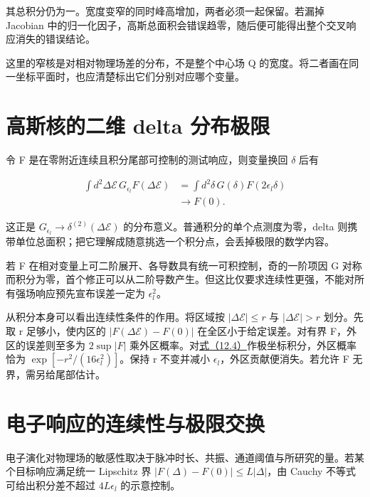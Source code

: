 \documentclass[UTF8,a4paper,zihao=-4,openany,fontset=fandol]{ctexbook}
\begin{document}
其总积分仍为一。宽度变窄的同时峰高增加，两者必须一起保留。若漏掉 Jacobian 中的归一化因子，高斯总面积会错误趋零，随后便可能得出整个交叉响应消失的错误结论。



这里的窄核是对相对物理场差的分布，不是整个中心场 Q 的宽度。将二者画在同一坐标平面时，也应清楚标出它们分别对应哪个变量。



\section{高斯核的二维 delta 分布极限}\label{sec:12:6}


令 F 是在零附近连续且积分尾部可控制的测试响应，则变量换回 $\delta$ 后有



\begin{equation*}
\begin{aligned}
\int d^2\Delta\mathcal E\,G_{\epsilon_l}F(\Delta\mathcal E)
&=\int d^2\delta\,G(\delta)F(2\epsilon_l\delta)\\
&\longrightarrow F(0).
\end{aligned}
\tag{12.5}\label{eq:12.5}
\end{equation*}


这正是 $G_{\epsilon_l}\to\delta^{(2)}(\Delta\mathcal E)$ 的分布意义。普通积分的单个点测度为零，delta 则携带单位总面积；把它理解成随意挑选一个积分点，会丢掉极限的数学内容。



若 F 在相对变量上可二阶展开、各导数具有统一可积控制，奇的一阶项因 G 对称而积分为零，首个修正可以从二阶导数产生。但这比仅要求连续性更强，不能对所有强场响应预先宣布误差一定为 $\epsilon_l^2$。



从积分本身可以看出连续性条件的作用。将区域按 $|\Delta\mathcal E|\le r$ 与 $|\Delta\mathcal E|>r$ 划分。先取 r 足够小，使内区的 $|F(\Delta\mathcal E)-F(0)|$ 在全区小于给定误差。对有界 F，外区的误差则至多为 $2\sup|F|$ 乘外区概率。对\hyperref[eq:12.4]{式（12.4）}作极坐标积分，外区概率恰为 $\exp[-r^2/(16\epsilon_l^2)]$。保持 r 不变并减小 $\epsilon_l$，外区贡献便消失。若允许 F 无界，需另给尾部估计。



\section{电子响应的连续性与极限交换}\label{sec:12:7}


电子演化对物理场的敏感性取决于脉冲时长、共振、通道阈值与所研究的量。若某个目标响应满足统一 Lipschitz 界 $|F(\Delta)-F(0)|\le L|\Delta|$，由 Cauchy 不等式可给出积分差不超过 $4L\epsilon_l$ 的示意控制。
\end{document}
